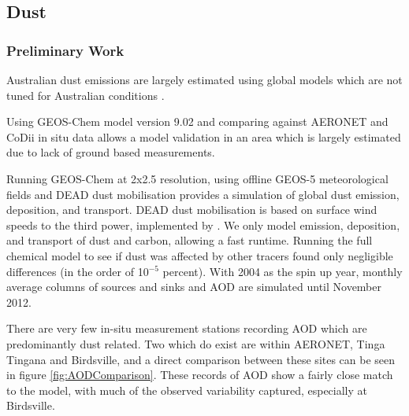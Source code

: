 \subsection{Dust}
\subsubsection{Preliminary Work}
Australian dust emissions are largely estimated using global models which are not tuned for Australian conditions \cite{Ridley_2013,Duncan_Fairlie_2007}.

Using GEOS-Chem model version 9.02 and comparing against AERONET and CoDii in situ data allows a model validation in an area which is largely estimated due to lack of ground based measurements.

Running GEOS-Chem at 2x2.5 resolution, using offline GEOS-5 meteorological fields and DEAD dust mobilisation provides a simulation of global dust emission, deposition, and transport.
DEAD dust mobilisation is based on surface wind speeds to the third power, implemented by \citet{Duncan_Fairlie_2007}.
We only model emission, deposition, and transport of dust and carbon, allowing a fast runtime.
Running the full chemical model to see if dust was affected by other tracers found only negligible differences (in the order of 10$^{-5}$ percent).
With 2004 as the spin up year, monthly average columns of sources and sinks and AOD are simulated until November 2012.

There are very few in-situ measurement stations recording AOD which are predominantly dust related.
Two which do exist are within AERONET, Tinga Tingana and Birdsville, and a direct comparison between these sites can be seen in figure \ref{fig:AODComparison}.
These records of AOD show a fairly close match to the model, with much of the observed variability captured, especially at Birdsville.
